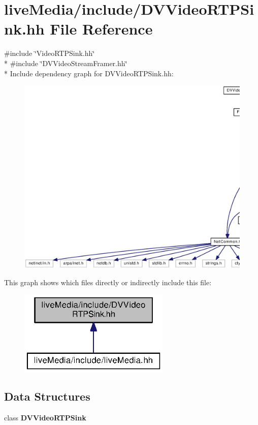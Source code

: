 \section{live\+Media/include/\+D\+V\+Video\+R\+T\+P\+Sink.hh File Reference}
\label{DVVideoRTPSink_8hh}
{\ttfamily \#include \char`\"{}Video\+R\+T\+P\+Sink.\+hh\char`\"{}}\\*
{\ttfamily \#include \char`\"{}D\+V\+Video\+Stream\+Framer.\+hh\char`\"{}}\\*
Include dependency graph for D\+V\+Video\+R\+T\+P\+Sink.\+hh\+:
\nopagebreak
\begin{figure}[H]
\begin{center}
\leavevmode
\includegraphics[width=350pt]{DVVideoRTPSink_8hh__incl}
\end{center}
\end{figure}
This graph shows which files directly or indirectly include this file\+:
\nopagebreak
\begin{figure}[H]
\begin{center}
\leavevmode
\includegraphics[width=204pt]{DVVideoRTPSink_8hh__dep__incl}
\end{center}
\end{figure}
\subsection*{Data Structures}
\begin{DoxyCompactItemize}
\item 
class {\bf D\+V\+Video\+R\+T\+P\+Sink}
\end{DoxyCompactItemize}
